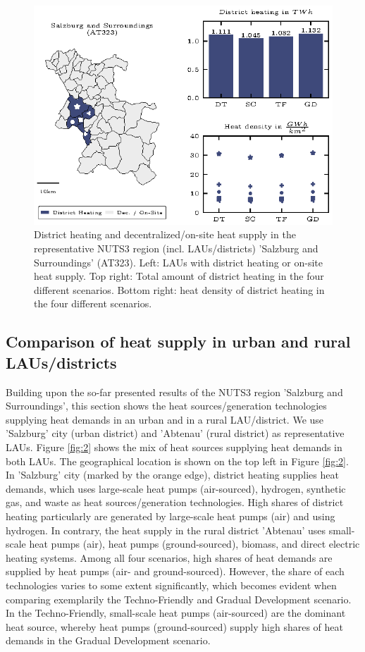 \begin{figure}[h]
	\centering
	\includegraphics[width=1\linewidth]{figures/lau-networks/network-salzburg.eps}
	\caption{District heating and decentralized/on-site heat supply in the representative NUTS3 region (incl. LAUs/districts) 'Salzburg and Surroundings' (AT323). Left: LAUs with district heating or on-site heat supply. Top right: Total amount of district heating in the four different scenarios. Bottom right: heat density of district heating in the four different scenarios.}
	\label{fig:1}
\end{figure}

\subsection{Comparison of heat supply in urban and rural LAUs/districts}\label{results2}
Building upon the so-far presented results of the NUTS3 region 'Salzburg and Surroundings', this section shows the heat sources/generation technologies supplying heat demands in an urban and in a rural LAU/district. We use 'Salzburg' city (urban district) and 'Abtenau' (rural district) as representative LAUs. Figure \ref{fig:2} shows the mix of heat sources supplying heat demands in both LAUs. The geographical location is shown on the top left in Figure \ref{fig:2}. In 'Salzburg' city (marked by the orange edge), district heating supplies heat demands, which uses large-scale heat pumps (air-sourced), hydrogen, synthetic gas, and waste as heat sources/generation technologies. High shares of district heating particularly are generated by large-scale heat pumps (air) and using hydrogen. In contrary, the heat supply in the rural district 'Abtenau' uses small-scale heat pumps (air), heat pumps (ground-sourced), biomass, and direct electric heating systems. Among all four scenarios, high shares of heat demands are supplied by heat pumps (air- and ground-sourced). However, the share of each technologies varies to some extent significantly, which becomes evident when comparing exemplarily the Techno-Friendly and Gradual Development scenario. In the Techno-Friendly, small-scale heat pumps (air-sourced) are the dominant heat source, whereby heat pumps (ground-sourced) supply high shares of heat demands in the Gradual Development scenario.

